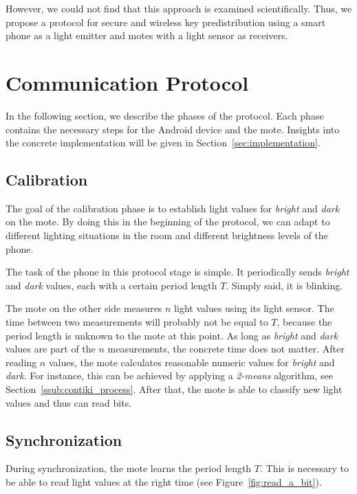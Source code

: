 \documentclass{sig-alternate} %
\begin{document}
However, we could not find that this approach is examined scientifically.
Thus, we propose a protocol for secure and wireless key predistribution using a smart phone as a light emitter and motes with a light sensor as receivers.

\section{Communication Protocol}
\label{sec:communication_protocol}

In the following section, we describe the phases of the protocol.
Each phase contains the necessary steps for the Android device and the mote.
Insights into the concrete implementation will be given in Section~\ref{sec:implementation}.

\subsection{Calibration}
\label{sub:calibration}

The goal of the calibration phase is to establish light values for \textit{bright} and \textit{dark} on the mote.
By doing this in the beginning of the protocol, we can adapt to different lighting situations in the room and different brightness levels of the phone.

The task of the phone in this protocol stage is simple.
It periodically sends \textit{bright} and \textit{dark} values, each with a certain period length $T$.
Simply said, it is blinking.

The mote on the other side measures $n$ light values using its light sensor.
The time between two measurements will probably not be equal to $T$, because the period length is unknown to the mote at this point.
As long as \textit{bright} and \textit{dark} values are part of the $n$ measurements, the concrete time does not matter.
After reading $n$ values, the mote calculates reasonable numeric values for \textit{bright} and \textit{dark}.
For instance, this can be achieved by applying a \mbox{\textit{2-means}} algorithm, see Section~\ref{ssub:contiki_process}.
After that, the mote is able to classify new light values and thus can read bits.

\subsection{Synchronization}
\label{sub:synchronization}

During synchronization, the mote learns the period length $T$.
This is necessary to be able to read light values at the right time (see Figure~\ref{fig:read_a_bit}).
\end{document}
